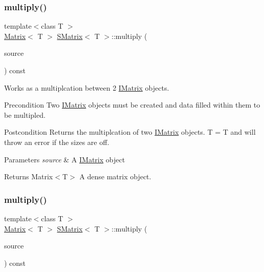 \subsubsection{\texorpdfstring{multiply()}{multiply()}\hspace{0.1cm}{\footnotesize\ttfamily [4/6]}}
{\footnotesize\ttfamily template$<$class T $>$ \\
\mbox{\hyperlink{class_matrix}{Matrix}}$<$ T $>$ \mbox{\hyperlink{class_s_matrix}{S\+Matrix}}$<$ T $>$\+::multiply (\begin{DoxyParamCaption}\item[{const \mbox{\hyperlink{class_i_matrix}{I\+Matrix}}$<$ \mbox{\hyperlink{class_u_matrix}{U\+Matrix}}$<$ T $>$, T $>$ \&}]{source }\end{DoxyParamCaption}) const}



Works as a multiplcation between 2 \mbox{\hyperlink{class_i_matrix}{I\+Matrix}} objects. 

\begin{DoxyPrecond}{Precondition}
Two \mbox{\hyperlink{class_i_matrix}{I\+Matrix}} objects must be created and data filled within them to be multipled. 
\end{DoxyPrecond}
\begin{DoxyPostcond}{Postcondition}
Returns the multiplcation of two \mbox{\hyperlink{class_i_matrix}{I\+Matrix}} objects. T = T and will throw an error if the sizes are off.
\end{DoxyPostcond}

\begin{DoxyParams}{Parameters}
{\em source} & A \mbox{\hyperlink{class_i_matrix}{I\+Matrix}} object \\
\hline
\end{DoxyParams}
\begin{DoxyReturn}{Returns}
Matrix$<$\+T$>$ A dense matrix object. 
\end{DoxyReturn}
\mbox{\label{class_s_matrix_a7a59af4ecdf50b7d0cb901e0de127372}} 
\subsubsection{\texorpdfstring{multiply()}{multiply()}\hspace{0.1cm}{\footnotesize\ttfamily [5/6]}}
{\footnotesize\ttfamily template$<$class T $>$ \\
\mbox{\hyperlink{class_matrix}{Matrix}}$<$ T $>$ \mbox{\hyperlink{class_s_matrix}{S\+Matrix}}$<$ T $>$\+::multiply (\begin{DoxyParamCaption}\item[{const \mbox{\hyperlink{class_i_matrix}{I\+Matrix}}$<$ \mbox{\hyperlink{class_s_matrix}{S\+Matrix}}$<$ T $>$, T $>$ \&}]{source }\end{DoxyParamCaption}) const\hspace{0.3cm}{\ttfamily [virtual]}}



